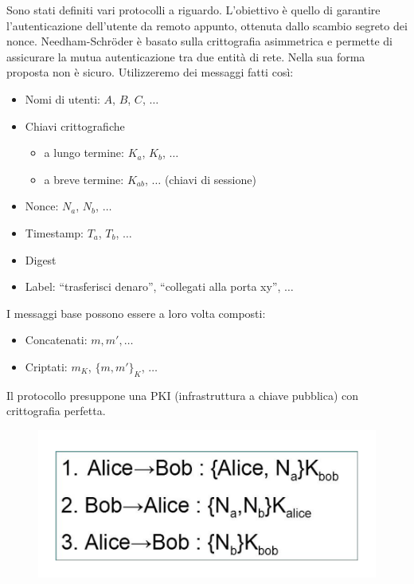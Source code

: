 Sono stati definiti vari protocolli a riguardo. L'obiettivo è quello di
garantire l'autenticazione
dell'utente da remoto appunto, ottenuta dallo scambio segreto dei nonce.
Needham-Schröder è basato sulla crittografia asimmetrica e permette
di assicurare la mutua
autenticazione tra due entità di rete. Nella sua forma proposta
non è sicuro.
Utilizzeremo dei messaggi fatti così:

\begin{itemize}
    \item Nomi di utenti: \(A\), \(B\), \(C\), \(\ldots \)
    \item Chiavi crittografiche
          \begin{itemize}
              \item a lungo termine: \(K_a\), \(K_b\), \(\ldots \)
              \item a breve termine: \(K_{ab}\),  \(\ldots \) (chiavi di sessione)
          \end{itemize}
    \item Nonce: \(N_a\), \(N_b\), \(\ldots \)
    \item Timestamp: \(T_a\), \(T_b\), \(\ldots \)
    \item Digest
    \item Label: “trasferisci denaro”, “collegati alla porta xy”, \(\ldots \)
\end{itemize}

I messaggi base possono essere a loro volta composti:
\begin{itemize}
    \item Concatenati: \(m, m', \ldots\)
    \item Criptati: \(m_K\), \(\{m,m'\}_K\), \(\ldots\)
\end{itemize}

Il protocollo presuppone una PKI (infrastruttura a chiave pubblica)
con crittografia perfetta.

\begin{figure}[H]
    \centering
    \includegraphics[width=\textwidth, keepaspectratio]{capitoli/crittografia/imgs/alieno.png}
\end{figure}

